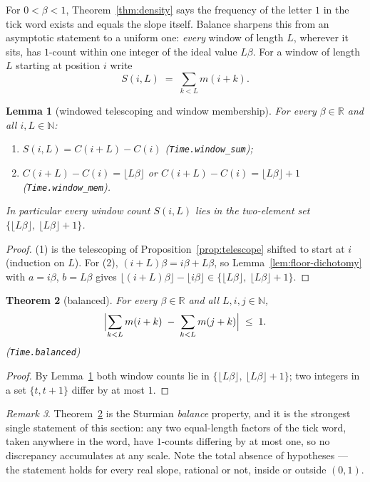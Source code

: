 \documentclass[11pt]{amsart}
\theoremstyle{plain}
\newtheorem{theorem}{Theorem}[section]
\newtheorem{lemma}[theorem]{Lemma}
\theoremstyle{definition}
\theoremstyle{remark}
\newtheorem{remark}[theorem]{Remark}
\begin{document}
For $0 < \beta < 1$, Theorem~\ref{thm:density} says the frequency of the letter $1$ in the tick word exists and equals the slope itself. Balance sharpens this from an asymptotic statement to a uniform one: \emph{every} window of length $L$, wherever it sits, has $1$-count within one integer of the ideal value $L\beta$. For a window of length $L$ starting at position $i$ write
\[
  S(i, L) \;=\; \sum_{k < L} m(i + k).
\]

\begin{lemma}[windowed telescoping and window membership]\label{lem:window}
For every $\beta \in \mathbb{R}$ and all $i, L \in \mathbb{N}$:
\begin{enumerate}
\item $S(i, L) = C(i + L) - C(i)$ (\texttt{Time.window\_sum});
\item $C(i + L) - C(i) = \lfloor L\beta \rfloor$ or $C(i + L) - C(i) = \lfloor L\beta \rfloor + 1$ (\texttt{Time.window\_mem}).
\end{enumerate}
In particular every window count $S(i, L)$ lies in the two-element set $\{\lfloor L\beta \rfloor,\ \lfloor L\beta \rfloor + 1\}$.
\end{lemma}

\begin{proof}
(1) is the telescoping of Proposition~\ref{prop:telescope} shifted to start at $i$ (induction on $L$). For (2), $(i + L)\beta = i\beta + L\beta$, so Lemma~\ref{lem:floor-dichotomy} with $a = i\beta$, $b = L\beta$ gives $\lfloor (i+L)\beta \rfloor - \lfloor i\beta \rfloor \in \{\lfloor L\beta \rfloor,\ \lfloor L\beta \rfloor + 1\}$.
\end{proof}

\begin{theorem}[balanced]\label{thm:balanced}
For every $\beta \in \mathbb{R}$ and all $L, i, j \in \mathbb{N}$,
\[
  \Bigl| \sum_{k < L} m(i + k) \;-\; \sum_{k < L} m(j + k) \Bigr| \;\le\; 1.
\]
(\texttt{Time.balanced})
\end{theorem}

\begin{proof}
By Lemma~\ref{lem:window} both window counts lie in $\{\lfloor L\beta \rfloor,\ \lfloor L\beta \rfloor + 1\}$; two integers in a set $\{t, t+1\}$ differ by at most $1$.
\end{proof}

\begin{remark}\label{rem:balance-strength}
Theorem~\ref{thm:balanced} is the Sturmian \emph{balance} property, and it is the strongest single statement of this section: any two equal-length factors of the tick word, taken anywhere in the word, have $1$-counts differing by at most one, so no discrepancy accumulates at any scale. Note the total absence of hypotheses --- the statement holds for every real slope, rational or not, inside or outside $(0,1)$.
\end{remark}
\end{document}
